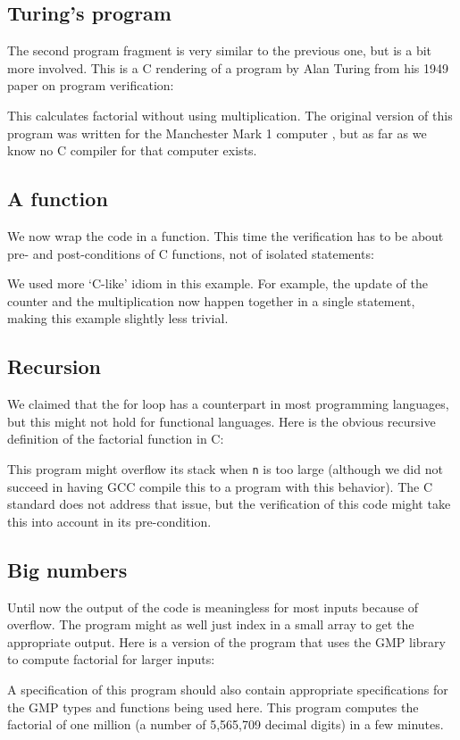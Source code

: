\documentclass{article}
\begin{document}
\subsection{Turing's program}
The second program fragment is very similar to the previous one, but is a bit more involved.
This is a C rendering of a program by Alan Turing from his 1949 paper \cite{tur:49}
on program verification:

This calculates factorial without using multiplication.
The original version of this program was written for the Manchester Mark 1 computer \cite{wie:16}, but as far as we know no C compiler for that computer exists.

\subsection{A function}
We now wrap the code in a function.
This time the verification has to be about pre- and post-conditions
of C functions, not of isolated statements:

We used more `C-like' idiom in this example.
For example, the update of the counter and the multiplication now
happen together in a single statement, making this example slightly less trivial.

\subsection{Recursion}
We claimed that the for loop has a counterpart in most programming languages,
but this might not hold for functional languages.
Here is the obvious recursive definition of the factorial function in C:

This program might overflow its stack when \texttt{n} is too large
(although we did not succeed in having GCC compile this to a program
with this behavior).
The C standard does not address that issue, but the verification of this
code might take this into account in its pre-condition.

\subsection{Big numbers}
Until now the output of the code is meaningless for most inputs because of overflow.
The program might as well just index in a small array to get the appropriate
output.
Here is a version of the program that uses the GMP library \cite{gra:16} to
compute factorial for larger inputs:

A specification of this program should also contain appropriate specifications
for the GMP types and functions being used here.
This program computes the factorial of one million (a number of 5,565,709 decimal digits)
in a few minutes.
\end{document}
